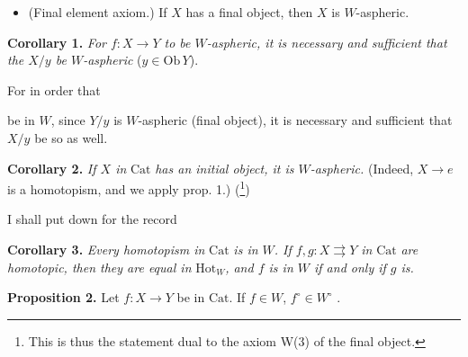 \documentclass[11pt]{article}
\newcommand{\Cat}{\mathrm{Cat}}
\newcommand{\fl}{\longrightarrow}
\newcommand{\Ob}{\mathrm{Ob}\,}
\newcommand{\Hot}{\mathrm{Hot}}
\begin{document}
\begin{itemize}[leftmargin=*]
\item[\textbf{W(3)}] (Final element axiom.) If $X$ has a final object, then $X$ is $W$-aspheric.
\end{itemize}

\textbf{Corollary 1.} \textit{For $f : X \fl Y$ to be $W$-aspheric, it is necessary and sufficient that the $X/y$ be $W$-aspheric} ($y \in \Ob Y$).

For in order that
be in $W$, since $Y/y$ is $W$-aspheric (final object), it is necessary and sufficient that $X/y$ be so as well.

\textbf{Corollary 2.} \textit{If $X$ in} $\Cat$ \textit{has an initial object, it is $W$-aspheric.} (Indeed, $X \fl e$ is a homotopism, and we apply prop. 1.) (\footnote{This is thus the statement dual to the axiom W(3) of the final object.})

I shall put down for the record

\textbf{Corollary 3.} \textit{Every homotopism in} $\Cat$ \textit{is in $W$. If $f, g : X \rightrightarrows Y$ in} $\Cat$ \textit{are homotopic, then they are equal in} $\Hot_W$\textit{, and $f$ is in $W$ if and only if $g$ is.}

\textbf{Proposition 2.} Let $f : X \fl Y$ be in $\Cat$. If $f \in W$, $f^\circ \in W^\circ$ .
\end{document}
